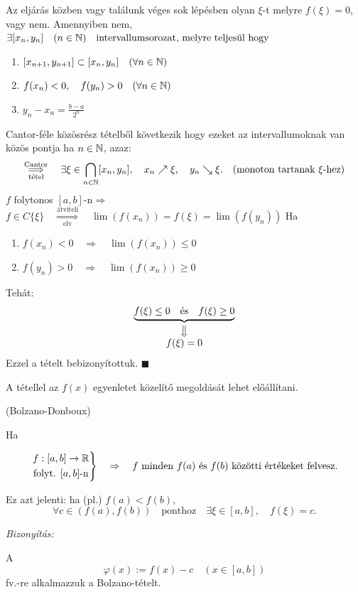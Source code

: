 \documentclass[a4paper,11.5pt]{article}
\begin{document}
\begin{theorem}
		\medskip
		Az eljárás közben vagy találunk véges sok lépésben olyan  $\xi$-t melyre $f(\xi)=0$, vagy nem. Amennyiben nem,
		$\exists[x_n,y_n]\quad (n\in\mathbb{N}) \quad \text{intervallumsorozat, melyre teljesül hogy}$
		\begin{enumerate}
			\item $[x_{n+1}, y_{n+1}]\subset[x_n,y_n]\quad (\forall n\in\mathbb{N})$
			\item $f(x_n)<0,\quad f(y_n)>0\quad (\forall n\in\mathbb{N})$
			\item $y_n-x_n=\displaystyle \frac{b-a}{2^n}$
		\end{enumerate}
		Cantor-féle közösrész tételből következik hogy ezeket az intervallumoknak van közös pontja ha $n\in\mathbb{N}$, azaz:
		\[ \overset{\text{Cantor}}{\underset{\text{tétel}}{\Longrightarrow}}\quad \exists\xi\in\bigcap_{n\in\mathbb{N}}[x_n,y_n],\quad x_n\nearrow\xi, \quad y_n\searrow\xi. \quad (\text{monoton tartanak $\xi$-hez})\]
		$f$ folytonos $[a,b]$-n\quad $\Rightarrow$ \quad $f\in C\{\xi \} \quad \overset{\text{átviteli}}{\underset{\text{elv}}{\Longrightarrow}}\quad \lim(f(x_n))=f(\xi)=\lim(f(y_n))$
		Ha
		\begin{enumerate}
			\item $f(x_n)< 0\quad \Rightarrow\quad \lim(f(x_n))\leq0$
			\item $f(y_n)>0\quad \Rightarrow\quad \lim(f(x_n))\geq 0$
		\end{enumerate}
		Tehát:
		\[\underbrace{f(\xi)\leq 0 \quad \text{és}\quad f(\xi)\geq0}_{\substack{\big\Downarrow\\\displaystyle f(\xi)=0}}\]
		Ezzel a tételt bebizonyítottuk. \quad $\blacksquare$
	\end{theorem}
	\begin{note}
		A tétellel az $f(x)$ egyenletet közelítő megoldását lehet előállítani.
	\end{note}
	\begin{theorem}
		(Bolzano-Donboux)
		
		Ha 
		
		\[\left.\begin{gathered}
		f:[a,b]\rightarrow\mathbb{R}\\
		\text{folyt. } [a,b]\text{-n}
		\end{gathered}\right\}\quad \Rightarrow\quad f \text{ minden } f(a)\text{ és }f(b) \text{ közötti értékeket felvesz.}\]
		\begin{note}
			Ez azt jelenti: ha (pl.) $f(a)<f(b)$,
			\[ \forall c\in(f(a),f(b)) \quad \text{ponthoz}\quad \exists\xi\in[a,b],\quad f(\xi)=c. \]
		\end{note}
		\textit{Bizonyítás:}
		
		A \[\varphi(x):=f(x)-c\quad (x\in[a,b])\] fv.-re alkalmazzuk a Bolzano-tételt.
	\end{theorem}
\end{document}
